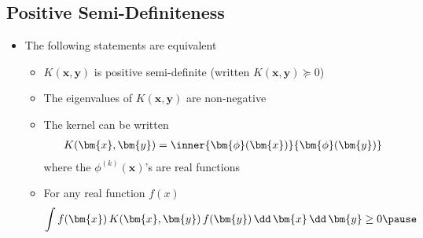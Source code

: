 
\begin{slide}
\section{Positive Semi-Definiteness}

\begin{PauseHighLight}
  \begin{itemize}
  \item The following statements are equivalent
    \begin{itemize}
    \item $K(\bm{x}, \bm{y})$ is positive semi-definite (written
      $K(\bm{x}, \bm{y})\succeq 0$)\pause
    \item The eigenvalues of $K(\bm{x}, \bm{y})$ are non-negative\pause
    \item The kernel can be written
      \begin{align*}
        K(\bm{x}, \bm{y}) =  \inner{\strut\bm{\phi}(\bm{x})}{\bm{\phi}(\bm{y})}
      \end{align*}
      where the $\phi^{(k)}(\bm{x})$'s are real functions\pause
    \item For any real function $f(x)$
      \begin{align*}
        \int f(\bm{x})\, K(\bm{x}, \bm{y}) \, f(\bm{y})
         \, \dd \, \bm{x}  \, \dd \, \bm{y} \geq 0\pause
      \end{align*}
    \end{itemize}
  \end{itemize}
\end{PauseHighLight}

\end{slide}



